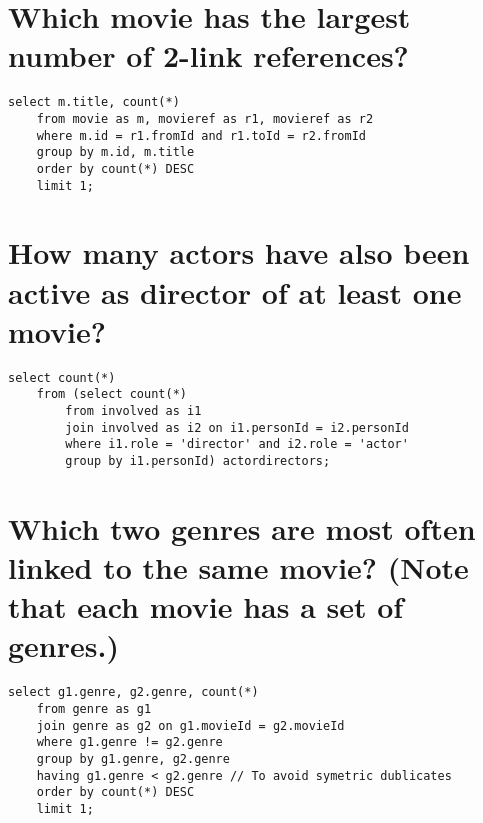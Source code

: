 \documentclass[a4paper,11pt]{memoir}
\begin{document}
\section{Which movie has the largest number of 2-link references?}
\begin{lstlisting}
select m.title, count(*)
	from movie as m, movieref as r1, movieref as r2
	where m.id = r1.fromId and r1.toId = r2.fromId
	group by m.id, m.title
	order by count(*) DESC
	limit 1;
\end{lstlisting}

\section{How many actors have also been active as director of at least one movie?}
\begin{lstlisting}
select count(*) 
	from (select count(*)
		from involved as i1
		join involved as i2 on i1.personId = i2.personId
		where i1.role = 'director' and i2.role = 'actor'
		group by i1.personId) actordirectors;
\end{lstlisting}

\section{Which two genres are most often linked to the same movie? (Note that each movie has a set of genres.)}
\begin{lstlisting}
select g1.genre, g2.genre, count(*)
	from genre as g1
	join genre as g2 on g1.movieId = g2.movieId
	where g1.genre != g2.genre
	group by g1.genre, g2.genre
	having g1.genre < g2.genre // To avoid symetric dublicates
	order by count(*) DESC
	limit 1;
\end{lstlisting}
\end{document}
